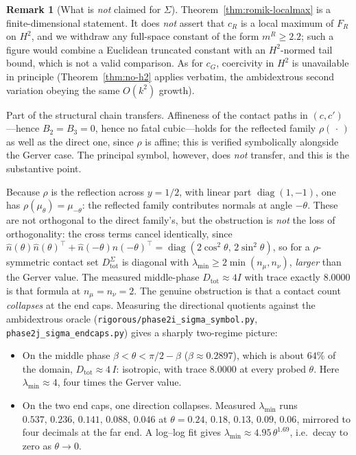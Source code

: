 \documentclass[11pt]{amsart}
\theoremstyle{plain}
\theoremstyle{definition}
\newtheorem{remark}[theorem]{Remark}
\newcommand{\cG}{c_{G}}
\begin{document}
\begin{remark}[What is \emph{not} claimed for $\Sigma$]
\label{rem:sigma-open}
Theorem~\ref{thm:romik-localmax} is a finite-dimensional statement.
It does \emph{not} assert that $c_{R}$ is a local maximum of $F_{R}$
on $H^{2}$, and we withdraw any full-space constant of the form
$m^{R} \geq 2.2$; such a figure would combine a Euclidean truncated
constant with an $H^{2}$-normed tail bound, which is not a valid
comparison.  As for $\cG$, coercivity in $H^{2}$ is unavailable in
principle (Theorem~\ref{thm:no-h2} applies verbatim, the ambidextrous
second variation obeying the same $O(k^{2})$ growth).

Part of the structural chain transfers.  Affineness of the contact
paths in $(c,c')$---hence $B_{2}=B_{3}=0$, hence no fatal cubic---holds
for the reflected family $\rho(\,\cdot\,)$ as well as the direct one,
since $\rho$ is affine; this is verified symbolically alongside the
Gerver case.  The principal symbol, however, does \emph{not} transfer,
and this is the substantive point.

Because $\rho$ is the reflection across $y=1/2$, with linear part
$\operatorname{diag}(1,-1)$, one has $\rho(\mu_{\theta}) =
\mu_{-\theta}$: the reflected family contributes normals at angle
$-\theta$.  These are not orthogonal to the direct family's, but the
obstruction is \emph{not} the loss of orthogonality: the cross terms
cancel identically, since
$\hat n(\theta)\hat n(\theta)^{\top}+\hat n(-\theta)\hat n(-\theta)^{\top}
=\operatorname{diag}(2\cos^{2}\theta,\,2\sin^{2}\theta)$, so for a
$\rho$-symmetric contact set $D_{\mathrm{tot}}^{\Sigma}$ is diagonal
with $\lambda_{\min}\geq2\min(n_{\mu},n_{\nu})$, \emph{larger} than
the Gerver value.  The measured middle-phase $D_{\mathrm{tot}}\approx4I$
with trace exactly $8.0000$ is that formula at $n_{\mu}=n_{\nu}=2$.  The
genuine obstruction is that a contact count \emph{collapses} at the end
caps.  Measuring
the directional quotients against the ambidextrous oracle
(\texttt{rigorous/phase2i\_sigma\_symbol.py},
\texttt{phase2j\_sigma\_endcaps.py}) gives a sharply two-regime
picture:
\begin{itemize}
\item On the middle phase $\beta<\theta<\pi/2-\beta$
      ($\beta \approx 0.2897$), which is about $64\%$ of the domain,
      $D_{\mathrm{tot}} \approx 4\,I$: isotropic, with trace
      $8.0000$ at every probed $\theta$.  Here
      $\lambda_{\min}\approx 4$, four times the Gerver value.
\item On the two end caps, one direction collapses.  Measured
      $\lambda_{\min}$ runs
      $0.537,\,0.236,\,0.141,\,0.088,\,0.046$ at
      $\theta = 0.24,\,0.18,\,0.13,\,0.09,\,0.06$, mirrored to four
      decimals at the far end.  A log--log fit gives
      $\lambda_{\min}\approx 4.95\,\theta^{1.69}$, i.e.\ decay to zero
      as $\theta\to0$.
\end{itemize}


\end{remark}
\end{document}
